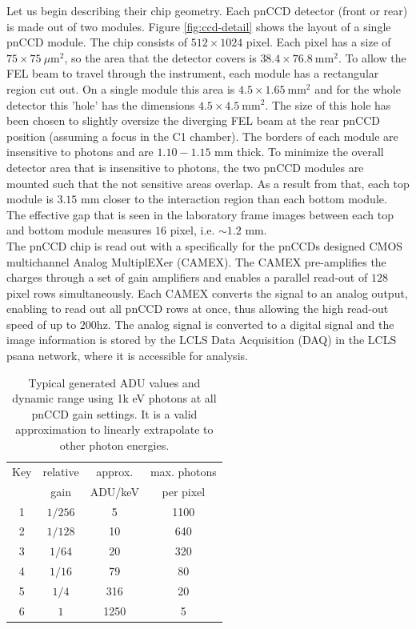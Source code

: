 Let us begin describing their chip geometry. Each pnCCD detector (front or rear) is made out of two modules. Figure \ref{fig:ccd-detail} shows the layout of a single pnCCD module. The chip consists of $512 \times 1024$ pixel. Each pixel has a size of $75 \times 75\ \mu \mathrm{m}^2$, so the area that the detector covers is $38.4 \times 76.8\ \mathrm{mm}^{2}$. To allow the FEL beam to travel through the instrument, each module has a rectangular region cut out. On a single module this area is $4.5 \times 1.65\ \mathrm{mm}^{2}$ and for the whole detector this 'hole' has the dimensions $4.5 \times 4.5\ \mathrm{mm}^{2}$. The size of this hole has been chosen to slightly oversize the diverging FEL beam at the rear pnCCD position (assuming a focus in the C1 chamber). The borders of each module are insensitive to photons and are $1.10 - 1.15$ mm thick. To minimize the overall detector area that is insensitive to photons, the two pnCCD modules are mounted such that the not sensitive areas overlap. As a result from that, each top module is $3.15$ mm closer to the interaction region than each bottom module. The effective gap that is seen in the laboratory frame images between each top and bottom module measures $16$ pixel, i.e. $\sim 1.2$ mm.\\
The pnCCD chip is read out with a specifically for the pnCCDs designed CMOS multichannel Analog MultiplEXer (CAMEX). The CAMEX pre-amplifies the charges through a set of gain amplifiers and enables a parallel read-out of $128$ pixel rows simultaneously. Each CAMEX converts the signal to an analog output, enabling to read out all pnCCD rows at once, thus allowing the high read-out speed of up to $200$hz. The analog signal is converted to a digital signal and the image information is stored by the LCLS Data Acquisition (DAQ) in the LCLS psana network, where it is accessible for analysis.\\
\begin{table}%
\centering
\begin{tabular}{ |c c c c |}
 \hline
 Key & relative  & approx.  & max. photons \\ 
     &   gain    & ADU/keV  & per pixel  \\
 \hline
 1 & $1/256$ & 5 & 1100  \\
 2 & $1/128$ & 10 & 640   \\
 3 & $1/64$ & 20 & 320   \\
 4 & $1/16$ & 79 & 80  \\
 5 & $1/4$ & 316 & 20  \\
 6 & $1$ & 1250 & 5  \\
 \hline
\end{tabular}
\caption[pnCCD gain modes and typical ADU values at 1k eV photons.]{Typical generated ADU values and dynamic range using 1k eV photons at all pnCCD gain settings. It is a valid approximation to linearly extrapolate to other photon energies.}
\label{tab:gain-modes}
\end{table}
